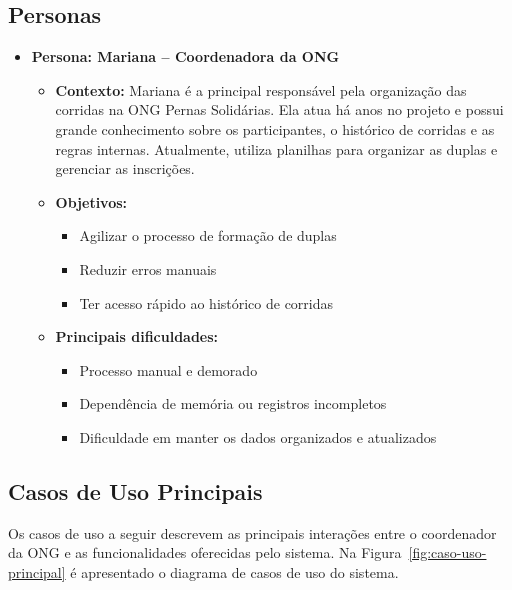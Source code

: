 \documentclass[12pt,a4paper]{article}
\begin{document}
\subsection{Personas}

\begin{itemize}

    \item \textbf{Persona: Mariana – Coordenadora da ONG}
    \begin{itemize}
        \item \textbf{Contexto:} Mariana é a principal responsável pela organização das
        corridas na ONG Pernas Solidárias. Ela atua há anos no projeto e possui grande
        conhecimento sobre os participantes, o histórico de corridas e as regras internas.
        Atualmente, utiliza planilhas para organizar as duplas e gerenciar as inscrições.

        \item \textbf{Objetivos:}
        \begin{itemize}
            \item Agilizar o processo de formação de duplas
            \item Reduzir erros manuais
            \item Ter acesso rápido ao histórico de corridas
        \end{itemize}

        \item \textbf{Principais dificuldades:}
        \begin{itemize}
            \item Processo manual e demorado
            \item Dependência de memória ou registros incompletos
            \item Dificuldade em manter os dados organizados e atualizados
        \end{itemize}
    \end{itemize}

\end{itemize}

\subsection{Casos de Uso Principais}

Os casos de uso a seguir descrevem as principais interações entre o coordenador da ONG e as funcionalidades oferecidas pelo sistema. Na Figura~\ref{fig:caso-uso-principal} é apresentado o diagrama de casos de uso do sistema.
\end{document}
